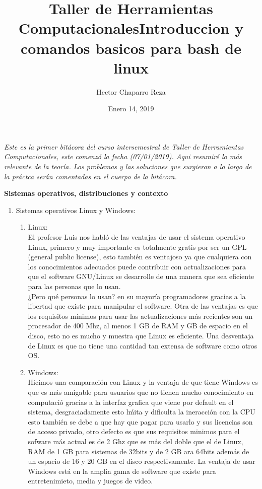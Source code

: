 \documentclass[letterpaper, 12pt, oneside]{article}
\title{\Huge{Taller de Herramientas Computacionales}}
\author{Hector Chaparro Reza}
\date{Enero 14, 2019}
\begin{document}
	\maketitle
	\it Este es la primer bit\'acora del curso intersemestral de Taller de Herramientas Computacionales, este comenz\'o la fecha (07/01/2019). Aqui resumir\'e lo m\'as relevante de la teor\'ia. Los problemas y las soluciones que surgieron a lo largo de la pr\'actca ser\'an comentadas en el cuerpo de la bit\'acora.
	\newpage
	
	\title{\Huge{Introduccion y comandos basicos para bash de linux}}
	
	\textbf{Sistemas operativos, distribuciones y contexto}
	
	\begin{enumerate}
		\item {Sistemas operativos Linux y Windows:}
		\begin{enumerate}
			\item Linux:\\
			El profesor Luis nos habl\'o de las ventajas de usar el sistema operativo Linux, primero y muy importante es totalmente gratis por ser un GPL (general public license), esto tambi\'en es ventajoso ya que cualquiera con los conocimientos adecuados puede contribuir con actualizaciones para que el software GNU/Linux se desarrolle de una manera que sea eficiente para las personas que lo usan.\\
			¿Pero qu\'e personas lo usan? en su mayor\'ia programadores gracias a la libertad que existe para manipular el software. Otra de las ventajas es que los requisitos m\'inimos para usar las actualizaciones m\'as recientes son un procesador de 400 Mhz, al menos 1 GB de RAM y  GB de espacio en el disco, esto no es mucho y muestra que Linux es eficiente. Una desventaja de Linux es que no tiene una cantidad tan extensa de software como otros OS.\\	
			\item Windows:\\
			Hicimos una comparaci\'on con Linux y la ventaja de que tiene Windows es que es m\'as amigable para usuarios que no tienen mucho conocimiento en computaci\'o gracias a la interfaz grafica que viene por default en el sistema, desgraciadamente esto l\'mita y dificulta la ineracci\'on con la CPU esto tambi\'en se debe a que hay que pagar para usarlo y sus licencias son de acceso privado, otro defecto es que sus requisitos minimos para el sofware m\'as actual es de 2 Ghz que es m\'as del doble que el de Linux, RAM de 1 GB para sistemas de 32bits y de 2 GB ara 64bits adem\'as de un espacio de 16 y 20 GB en el disco respectivamente. La ventaja de usar Windows est\'a en la amplia gama de software que existe para entretenimieto, media y juegos de video.
		\end{enumerate}
	

\end{enumerate}
\end{document}
